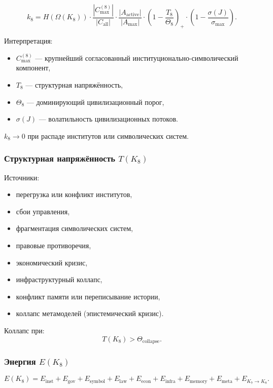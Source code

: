 \[
k_8 =
H(\Omega(K_8))
\cdot
\frac{|C_{\max}^{(8)}|}{|C_{\mathrm{all}}|}
\cdot
\frac{|A_{\mathrm{active}}|}{|A_{\max}|}
\cdot
\left(1-\frac{T_8}{\Theta_8}\right)_+
\cdot
\left(1-\frac{\sigma(J)}{\sigma_{\max}}\right).
\]

Интерпретация:
\begin{itemize}
    \item $C_{\max}^{(8)}$ — крупнейший согласованный институционально-символический компонент,
    \item $T_8$ — структурная напряжённость,
    \item $\Theta_8$ — доминирующий цивилизационный порог,
    \item $\sigma(J)$ — волатильность цивилизационных потоков.
\end{itemize}

$k_8 \to 0$ при распаде институтов или символических систем.

\subsubsection{Структурная напряжённость \texorpdfstring{$T(K_8)$}{$T(K_8)$}}

Источники:
\begin{itemize}
    \item перегрузка или конфликт институтов,
    \item сбои управления,
    \item фрагментация символических систем,
    \item правовые противоречия,
    \item экономический кризис,
    \item инфраструктурный коллапс,
    \item конфликт памяти или переписывание истории,
    \item коллапс метамоделей (эпистемический кризис).
\end{itemize}

Коллапс при:
\[
T(K_8) > \Theta_{\mathrm{collapse}}.
\]

\subsubsection{Энергия \texorpdfstring{$E(K_8)$}{$E(K_8)$}}

\[
E(K_8)=
E_{\mathrm{inst}}+
E_{\mathrm{gov}}+
E_{\mathrm{symbol}}+
E_{\mathrm{law}}+
E_{\mathrm{econ}}+
E_{\mathrm{infra}}+
E_{\mathrm{memory}}+
E_{\mathrm{meta}}+
E_{K_7\to K_8}.
\]

